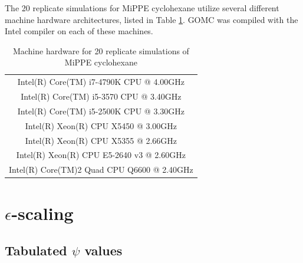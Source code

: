 \documentclass[journal=jctc,manuscript=article]{achemso}
\begin{document}
The 20 replicate simulations for MiPPE cyclohexane utilize several different machine hardware architectures, listed in Table \ref{SI tab: Machine hardware}. GOMC was compiled with the Intel compiler on each of these machines.

\begin{table}[htb!]
	\caption{Machine hardware for 20 replicate simulations of MiPPE cyclohexane} \label{SI tab: Machine hardware}
	\begin{center}
		\begin{tabular}{|c|}
			\hline
			Intel(R) Core(TM) i7-4790K CPU @ 4.00GHz \\
			Intel(R) Core(TM) i5-3570 CPU @ 3.40GHz \\
			Intel(R) Core(TM) i5-2500K CPU @ 3.30GHz \\
			Intel(R) Xeon(R) CPU X5450 @ 3.00GHz \\
			Intel(R) Xeon(R) CPU X5355 @ 2.66GHz \\
			Intel(R) Xeon(R) CPU E5-2640 v3 @ 2.60GHz \\
			Intel(R) Core(TM)2 Quad CPU Q6600 @ 2.40GHz \\
			\hline
		\end{tabular}
	\end{center}
\end{table}

\newpage
\clearpage

\section{$\epsilon$-scaling} \label{SI sec: eps scale}

\subsection{Tabulated $\psi$ values}
\end{document}
